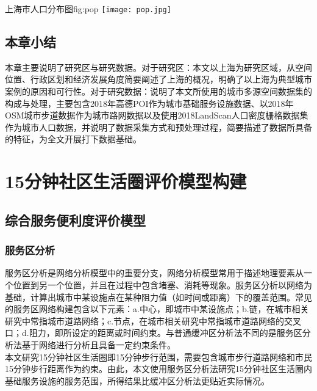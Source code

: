 \documentclass{shnuthesis}
\begin{document}
\vspace{1em}
\begin{generalfig}[htb]{上海市人口分布图}{fig:pop}
	\texttt{[image: pop.jpg]}
\end{generalfig}

\section{本章小结}

本章主要说明了研究区与研究数据。对于研究区：本文以上海为研究区域，从空间位置、行政区划和经济发展角度简要阐述了上海的概况，明确了以上海为典型城市案例的原因和可行性。对于研究数据：说明了本文所使用的城市多源空间数据集的构成与处理，主要包含2018年高德POI作为城市基础服务设施数据、以2018年OSM城市步道数据作为城市路网数据以及使用2018LandScan人口密度栅格数据集作为城市人口数据，并说明了数据采集方式和预处理过程，简要描述了数据所具备的特征，为全文开展打下数据基础。





\chapter{15分钟社区生活圈评价模型构建}

\section{综合服务便利度评价模型}

\subsection{服务区分析}

服务区分析是网络分析模型中的重要分支，网络分析模型常用于描述地理要素从一个位置到另一个位置，并且在过程中包含堵塞、消耗等现象\textsuperscript{\cite{wang2002}}。服务区分析以网络为基础，计算出城市中某设施点在某种阻力值（如时间或距离）下的覆盖范围。常见的服务区网络构建包含以下元素：a.中心，即城市中某设施点；b.链，在城市相关研究中常指城市道路网络；c.节点，在城市相关研究中常指城市道路网络的交叉口；d.阻力，即所设定的距离或时间约束\textsuperscript{\cite{chen2018}}。与普通缓冲区分析法不同的是服务区分析法基于网络进行分析且具备一定约束条件\textsuperscript{\cite{lixiaoma2009}}。\\
\indent 本文研究15分钟社区生活圈即15分钟步行范围，需要包含城市步行道路网络和市民15分钟步行距离作为约束。由此，本文使用服务区分析法研究15分钟社区生活圈内基础服务设施的服务范围，所得结果比缓冲区分析法更贴近实际情况。
\end{document}

